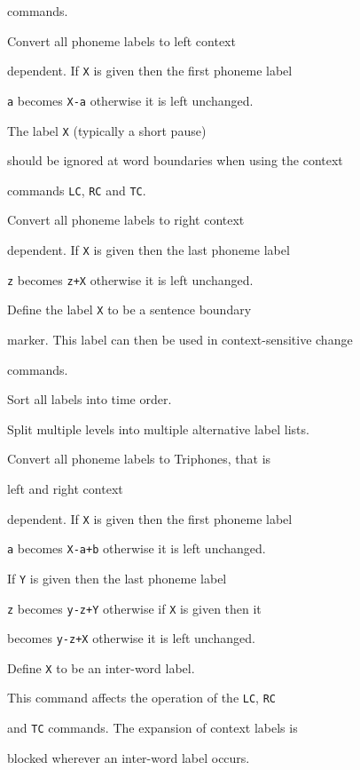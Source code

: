 \begin{varlist}
       commands.


    Convert all phoneme labels to left context


       dependent.  If \texttt{X} is given then the first phoneme label


       \texttt{a} becomes \texttt{X-a} otherwise it is left unchanged.


    The label  \texttt{X} (typically a short pause)


       should be ignored at word boundaries when using the context


       commands \texttt{LC}, \texttt{RC} and \texttt{TC}.


    Convert all phoneme labels to right context


       dependent.  If \texttt{X} is given then the last phoneme label


       \texttt{z} becomes \texttt{z+X} otherwise it is left unchanged.


     Define the label \texttt{X} to be a sentence boundary


       marker.  This label can then be used in context-sensitive change


       commands.


        Sort all labels into time order.


        Split multiple levels into multiple alternative label lists.


    Convert all phoneme labels to Triphones, that is


       left and right context


       dependent.  If \texttt{X} is given then the first phoneme label


       \texttt{a} becomes \texttt{X-a+b} otherwise it is left unchanged.


       If \texttt{Y} is given then the last phoneme label


       \texttt{z} becomes \texttt{y-z+Y} otherwise  if \texttt{X} is given then it


        becomes \texttt{y-z+X} otherwise it is left unchanged.


     Define \texttt{X} to be an inter-word label. 


       This command affects the operation of the \texttt{LC}, \texttt{RC}


       and \texttt{TC} commands.  The expansion of context labels is 


       blocked wherever an inter-word label occurs.


\end{varlist}





